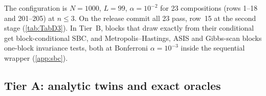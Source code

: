 The configuration is $N = 1000$, $L = 99$, $\alpha = 10^{-2}$ for 23 compositions (rows 1--18
and 201--205) at $n \le 3$. %
On the release commit all 23 pass, row~15 at the second stage (\cref{tab:TabD3}). %
\label{sec:validation-block}%
In Tier~B, blocks that draw exactly from their conditional get block-conditional SBC, and Metropolis--Hastings, ASIS and Gibbs-scan blocks one-block invariance
tests, both at Bonferroni $\alpha = 10^{-3}$ inside the sequential wrapper (\cref{app:sbc}). %

\subsection{Tier A: analytic twins and exact oracles}\label{sec:validation-twins}


